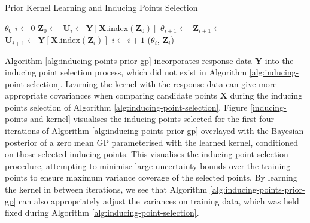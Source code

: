 \documentclass{article}
\numberwithin{equation}{section}
\begin{document}
\begin{algorithm}[h!]
\caption{Prior Kernel Learning and Inducing Points Selection}\label{alg:inducing-points-prior-gp}
\begin{algorithmic}
\Require $\theta_0$ 
 \State $i \leftarrow 0$
  \State $\mathbf{Z}_0 \leftarrow$  
  \State $\mathbf{U}_i \leftarrow \mathbf{Y}\left[\mathbf{X}.\text{index}\left(\mathbf{Z}_0\right)\right]$ 
\State $\theta_{i+1} \leftarrow$  
\State $\mathbf{Z}_{i+1} \leftarrow$ 
\State $\mathbf{U}_{i+1} \leftarrow \mathbf{Y}\left[\mathbf{X}.\text{index}\left(\mathbf{Z}_i\right)\right]$
\State $i \leftarrow i+1$
\EndWhile
\State \Return ($\theta_i$, $\mathbf{Z}_i$)
\end{algorithmic}
\end{algorithm}

Algorithm \ref{alg:inducing-points-prior-gp} incorporates response data $\mathbf{Y}$ into the inducing point selection process, which did not exist in Algorithm \ref{alg:inducing-point-selection}. 
Learning the kernel with the response data can give more appropriate covariances when comparing candidate points $\mathbf{X}$ during the inducing points selection of Algorithm \ref{alg:inducing-point-selection}. 
Figure \ref{inducing-points-and-kernel} visualises the inducing points selected for the first four iterations of Algorithm \ref{alg:inducing-points-prior-gp} overlayed with the Bayesian posterior of a zero mean GP parameterised with the learned kernel, conditioned on those selected inducing points. 
This visualises the inducing point selection procedure, attempting to minimise large uncertainty bounds over the training points to ensure maximum variance coverage of the selected points.
By learning the kernel in between iterations, we see that Algorithm \ref{alg:inducing-points-prior-gp} can also appropriately adjust the variances on training data, which was held fixed during Algorithm \ref{alg:inducing-point-selection}.
\end{document}
